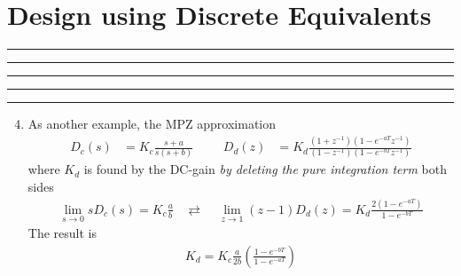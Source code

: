 \setcounter{chapter}{7}
\setcounter{section}{2}
\section{Design using Discrete Equivalents}
\vspace{-8pt} \hrule \hrule \hrule \hrule \hrule  \vspace{12pt}
\begin{enumerate}
	\setcounter{enumi}{3}
	\item As another example, the MPZ approximation  
		\begin{align*}
			D_c(s) &= K_c \frac{s+a}{s(s+b)} &&& D_d(z) &= K_d \frac{(1+z^{-1})(1-e^{-aT}z^{-1})}{(1-z^{-1})(1-e^{-bT}z^{-1})}
		\end{align*}
		where $K_d$ is found by the DC-gain \emph{by deleting the pure integration term} both sides
		\begin{align*}
			\lim_{s \rightarrow 0} sD_c(s) = K_c \frac{a}{b} ~~~~\rightleftarrows~~~~~ 
			\lim_{z \rightarrow 1} (z-1)D_d(z) = K_d \frac{2(1-e^{-aT})}{1-e^{-bT}} 
		\end{align*} 
		The result is
		\begin{align*}
			K_d = K_c \frac{a}{2b} \left( \frac{1-e^{-bT}}{1-e^{-aT}} \right) 
		\end{align*}
\end{enumerate}